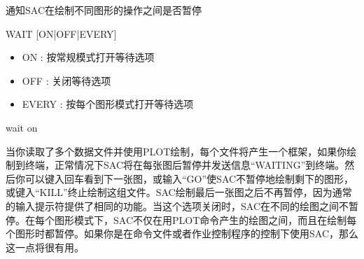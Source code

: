 \label{cmd:wait}

通知SAC在绘制不同图形的操作之间是否暂停

\begin{SACSTX}
WAIT [ON|OFF|EVERY]
\end{SACSTX}

\begin{itemize}
\item ON : 按常规模式打开等待选项 
\item OFF : 关闭等待选项 
\item EVERY : 按每个图形模式打开等待选项
\end{itemize}

\begin{SACDFT}
wait on
\end{SACDFT}

当你读取了多个数据文件并使用PLOT绘制，每个文件将产生一个框架，如果你绘制到终端，正常情况下SAC将在每张图后暂停并发送信息``WAITING''到终端。然后你可以键入回车看到下一张图，或输入``GO''使SAC不暂停地绘制剩下的图形，或键入``KILL''终止绘制这组文件。SAC绘制最后一张图之后不再暂停，因为通常的输入提示符提供了相同的功能。当这个选项关闭时，SAC在不同的绘图之间不暂停。在每个图形模式下，SAC不仅在用PLOT命令产生的绘图之间，而且在绘制每个图形时都暂停。如果你是在命令文件或者作业控制程序的控制下使用SAC，那么这一点将很有用。
